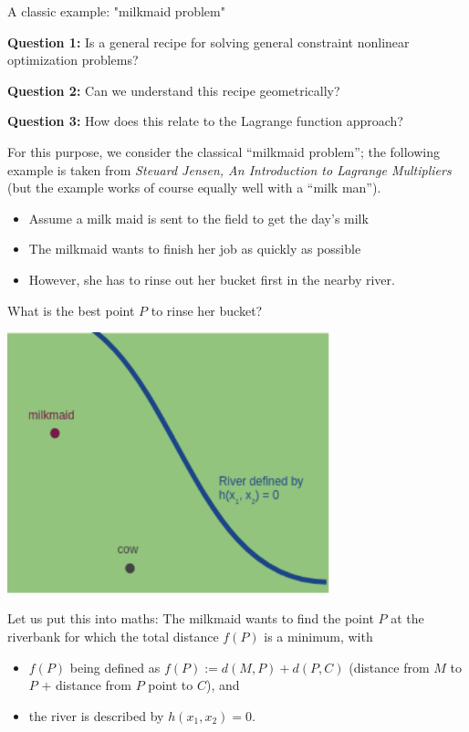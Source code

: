 \documentclass[11pt,compress,t,notes=noshow, xcolor=table]{beamer}
\begin{document}
\begin{vbframe}{A classic example: "milkmaid problem"}

\textbf{Question 1:} Is a general recipe for solving general constraint nonlinear optimization problems? 

\textbf{Question 2:} Can we understand this recipe geometrically?

\textbf{Question 3:} How does this relate to the Lagrange function approach?

\lz
For this purpose, we consider the classical \enquote{milkmaid problem}; the following example is taken
from \textit{Steuard Jensen, An Introduction to Lagrange Multipliers} (but the example works
of course equally well with a \enquote{milk man}). 

\begin{itemize}
	\item Assume a milk maid is sent to the field to get the day's milk
	\item The milkmaid wants to finish her job as quickly as possible
	\item However, she has to rinse out her bucket first in the nearby river. 
\end{itemize}

\framebreak 
What is the best point $P$ to rinse her bucket? 

\begin{center}
	\includegraphics[width = 0.7\textwidth]{figure_man/milkmaid1.png}
\end{center}

\framebreak 

Let us put this into maths: The milkmaid wants to find the point $P$ at the riverbank for which the total distance $f(P)$ is a minimum, with

\begin{itemize} 
\item $f(P)$ being defined as $f(P) := d(M, P) + d(P, C)$ 
(distance from $M$ to $P$ + distance from $P$ point to $C$), and
\item the river is described by $h(x_1, x_2) = 0$. 
\end{itemize}


\end{vbframe}
\end{document}
